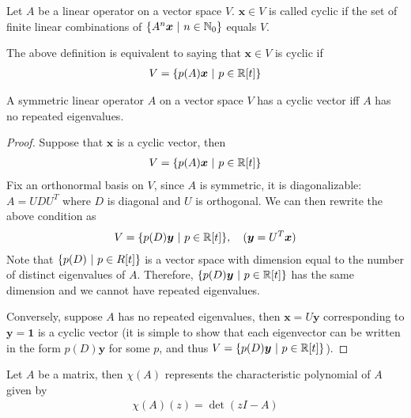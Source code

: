 \documentclass{math}
\renewcommand{\vec}[1]{\boldsymbol{#1}}
\begin{document}
\begin{definition}
    Let $A$ be a linear operator on a vector space $V$.
    $\vec{x} \in V$ is called cyclic if the set of finite linear combinations of $\setc{A^n\vec{x}}{n \in \mathbb{N}_0}$ equals $V$.
\end{definition}

The above definition is equivalent to saying that $\vec{x} \in V$ is cyclic if
\begin{align*}
    V = \setc{p(A)\vec{x}}{p \in \mathbb{R}[t]}
\end{align*}

\begin{lemma}
    A symmetric linear operator $A$ on a vector space $V$ has a cyclic vector iff $A$ has no repeated eigenvalues.
\end{lemma}
\begin{proof}
    Suppose that $\vec{x}$ is a cyclic vector, then
    \begin{align*}
        V = \setc{p(A)\vec{x}}{p \in \mathbb{R}[t]}
    \end{align*}
    Fix an orthonormal basis on $V$, since $A$ is symmetric, it is diagonalizable: $A = UDU^T$ where $D$ is diagonal and $U$ is orthogonal.
    We can then rewrite the above condition as
    \begin{align*}
        V = \setc{p(D)\vec{y}}{p \in \mathbb{R}[t]}, \quad (\vec{y} = U^T\vec{x})
    \end{align*}
    Note that $\{ p(D) \ | \ p \in R[t] \}$ is a vector space with dimension equal to the number of distinct eigenvalues of $A$.
    Therefore, $\setc{p(D)\vec{y}}{p \in \mathbb{R}[t]}$ has the same dimension and we cannot have repeated eigenvalues.

    Conversely, suppose $A$ has no repeated eigenvalues, then $\vec{x} = U \vec{y}$ corresponding to $\vec{y} = \vec{1}$ is a cyclic vector
    (it is simple to show that each eigenvector can be written in the form $p(D)\vec{y}$ for some $p$, and thus $V = \setc{p(D)\vec{y}}{p \in \mathbb{R}[t]}$).
\end{proof}

\begin{definition}
    Let $A$ be a matrix, then $\chi(A)$ represents the characteristic polynomial of $A$ given by
    \begin{align*}
        \chi(A)(z) = \det(zI - A)
    \end{align*}
\end{definition}
\end{document}
